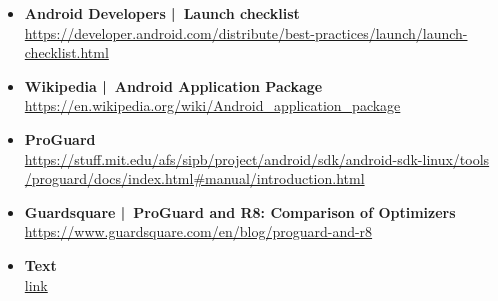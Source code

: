\documentclass[a4paper]{article}
\begin{document}
\begin{itemize}
			\item \textbf{Android Developers | Launch checklist}\\
			\href{https://developer.android.com/distribute/best-practices/launch/launch-checklist.html}
			{https://developer.android.com/distribute/best-practices/launch/launch-checklist.html}
			
			\item \textbf{Wikipedia | Android Application Package}\\
			\href{https://en.wikipedia.org/wiki/Android_application_package}
			{https://en.wikipedia.org/wiki/Android\_application\_package}
			
			\item \textbf{ProGuard}\\
			\href{https://stuff.mit.edu/afs/sipb/project/android/sdk/android-sdk-linux/tools/proguard/docs/index.html#manual/introduction.html}
			{https://stuff.mit.edu/afs/sipb/project/android/sdk/android-sdk-linux/tools\\ \quad /proguard/docs/index.html\#manual/introduction.html}
			
			\item \textbf{Guardsquare | ProGuard and R8: Comparison of Optimizers}\\
			\href{https://www.guardsquare.com/en/blog/proguard-and-r8}
			{https://www.guardsquare.com/en/blog/proguard-and-r8}
			
			\item \textbf{Text}\\
			\href{link}
			{link}
			
		\end{itemize}	
	
		\newpage
	
\end{document}
